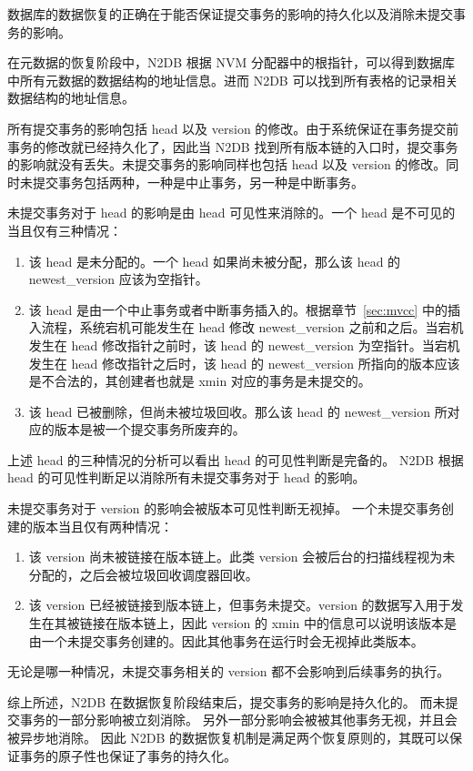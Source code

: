 数据库的数据恢复的正确在于能否保证提交事务的影响的持久化以及消除未提交事务的影响。

在元数据的恢复阶段中，N2DB 根据 NVM 分配器中的根指针，可以得到数据库中所有元数据的数据结构的地址信息。进而 N2DB 可以找到所有表格的记录相关数据结构的地址信息。

所有提交事务的影响包括 head 以及 version 的修改。由于系统保证在事务提交前事务的修改就已经持久化了，因此当 N2DB 找到所有版本链的入口时，提交事务的影响就没有丢失。未提交事务的影响同样也包括 head 以及 version 的修改。同时未提交事务包括两种，一种是中止事务，另一种是中断事务。

未提交事务对于 head 的影响是由 head 可见性来消除的。一个 head 是不可见的当且仅有三种情况：
\begin{enumerate}
    \item 该 head 是未分配的。一个 head 如果尚未被分配，那么该 head 的 newest\_version 应该为空指针。
    \item 该 head 是由一个中止事务或者中断事务插入的。根据章节~\ref{sec:mvcc} 中的插入流程，系统宕机可能发生在 head 修改 newest\_version 之前和之后。当宕机发生在 head 修改指针之前时，该 head 的 newest\_version 为空指针。当宕机发生在 head 修改指针之后时，该 head 的 newest\_version 所指向的版本应该是不合法的，其创建者也就是 xmin 对应的事务是未提交的。
    \item 该 head 已被删除，但尚未被垃圾回收。那么该 head 的 newest\_version 所对应的版本是被一个提交事务所废弃的。
\end{enumerate}
上述 head 的三种情况的分析可以看出 head 的可见性判断是完备的。
N2DB 根据 head 的可见性判断足以消除所有未提交事务对于 head 的影响。

未提交事务对于 version 的影响会被版本可见性判断无视掉。
一个未提交事务创建的版本当且仅有两种情况：
\begin{enumerate}
    \item 该 version 尚未被链接在版本链上。此类 version 会被后台的扫描线程视为未分配的，之后会被垃圾回收调度器回收。
    \item 该 version 已经被链接到版本链上，但事务未提交。version 的数据写入用于发生在其被链接在版本链上，因此 version 的 xmin 中的信息可以说明该版本是由一个未提交事务创建的。因此其他事务在运行时会无视掉此类版本。
\end{enumerate}
无论是哪一种情况，未提交事务相关的 version 都不会影响到后续事务的执行。

综上所述，N2DB 在数据恢复阶段结束后，提交事务的影响是持久化的。
而未提交事务的一部分影响被立刻消除。
另外一部分影响会被被其他事务无视，并且会被异步地消除。
因此 N2DB 的数据恢复机制是满足两个恢复原则的，其既可以保证事务的原子性也保证了事务的持久化。


